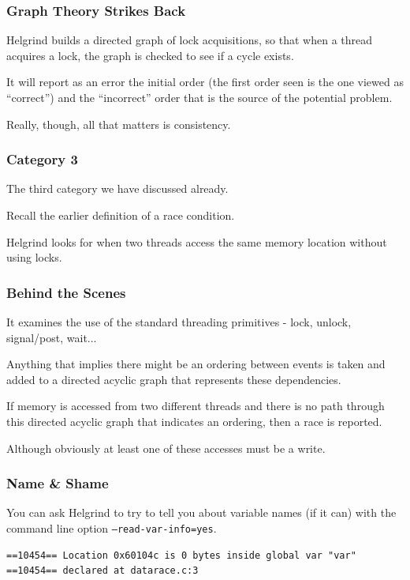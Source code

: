 \begin{frame}
	\frametitle{Graph Theory Strikes Back}


	Helgrind builds a directed graph of lock acquisitions, so that when a thread acquires a lock, the graph is checked to see if a cycle exists.

	It will report as an error the initial order (the first order seen is the one viewed as ``correct'') and the ``incorrect'' order that is the source of the potential problem.

	Really, though, all that matters is consistency.

\end{frame}


\begin{frame}
	\frametitle{Category 3}

	The third category we have discussed already.

	Recall the earlier definition of a race condition.

	Helgrind looks for when two threads access the same memory location without using locks.

\end{frame}

\begin{frame}
	\frametitle{Behind the Scenes}

	It examines the use of the standard threading primitives - lock, unlock, signal/post, wait...

	Anything that implies there might be an ordering between events is taken and added to a directed acyclic graph that represents these dependencies.

	If memory is accessed from two different threads and there is no path through this directed acyclic graph that indicates an ordering, then a race is reported.

	Although obviously at least one of these accesses must be a write.

\end{frame}

\begin{frame}[fragile]
	\frametitle{Name \& Shame}

	You can ask Helgrind to try to tell you about variable names (if it can) with the command line option \texttt{--read-var-info=yes}.

	\begin{verbatim}
==10454== Location 0x60104c is 0 bytes inside global var "var"
==10454== declared at datarace.c:3
\end{verbatim}

\end{frame}

